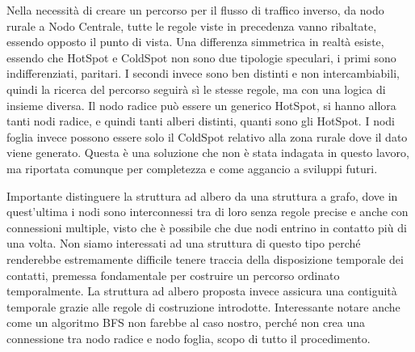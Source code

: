 \documentclass[12pt,a4paper,oneside]{book}
\begin{document}
		Nella necessità di creare un percorso per il flusso di traffico inverso, da nodo rurale a Nodo Centrale, tutte le regole viste in precedenza vanno ribaltate, essendo opposto il punto di vista. Una differenza simmetrica in realtà esiste, essendo che HotSpot e ColdSpot non sono due tipologie speculari, i primi sono indifferenziati, paritari. I secondi invece sono ben distinti e non intercambiabili, quindi la ricerca del percorso seguirà sì le stesse regole, ma con una logica di insieme diversa. Il nodo radice può essere un generico HotSpot, si hanno allora tanti nodi radice, e quindi tanti alberi distinti, quanti sono gli HotSpot. I nodi foglia invece possono essere solo il ColdSpot relativo alla zona rurale dove il dato viene generato. Questa è una soluzione che non è stata indagata in questo lavoro, ma riportata comunque per completezza e come aggancio a sviluppi futuri. 
		
		Importante distinguere la struttura ad albero da una struttura a grafo, dove in quest'ultima i nodi sono interconnessi tra di loro senza regole precise e anche con connessioni multiple, visto che è possibile che due nodi entrino in contatto più di una volta. Non siamo interessati ad una struttura di questo tipo perché renderebbe estremamente difficile tenere traccia della disposizione temporale dei contatti, premessa fondamentale per costruire un percorso ordinato temporalmente. La struttura ad albero proposta invece assicura una contiguità temporale grazie alle regole di costruzione introdotte. Interessante notare anche come un algoritmo BFS non farebbe al caso nostro, perché non crea una connessione tra nodo radice e nodo foglia, scopo di tutto il procedimento.
		
		
		
\end{document}
